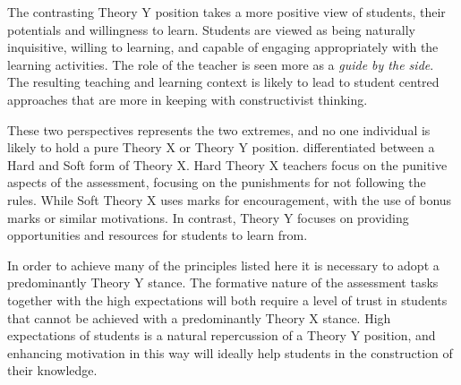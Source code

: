 The contrasting Theory Y position takes a more positive view of students, their potentials and willingness to learn. Students are viewed as being naturally inquisitive, willing to learning, and capable of engaging appropriately with the learning activities. The role of the teacher is seen more as a \emph{guide by the side}. The resulting teaching and learning context is likely to lead to student centred approaches that are more in keeping with constructivist thinking.

These two perspectives represents the two extremes, and no one individual is likely to hold a pure Theory X or Theory Y position. \citet{Markwell:2004} differentiated between a Hard and Soft form of Theory X. Hard Theory X teachers focus on the punitive aspects of the assessment, focusing on the punishments for not following the rules. While Soft Theory X uses marks for encouragement, with the use of bonus marks or similar motivations. In contrast, Theory Y focuses on providing opportunities and resources for students to learn from.

In order to achieve many of the principles listed here it is necessary to adopt a predominantly Theory Y stance. The formative nature of the assessment tasks together with the high expectations will both require a level of trust in students that cannot be achieved with a predominantly Theory X stance. High expectations of students is a natural repercussion of a Theory Y position, and enhancing motivation in this way will ideally help students in the construction of their knowledge.

